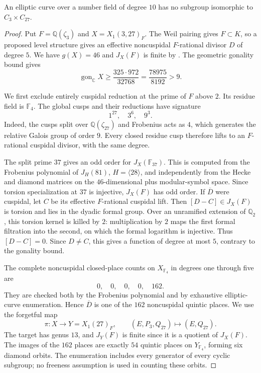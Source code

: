 \begin{proposition}\label{prop:decic-no327}
An elliptic curve over a number field of degree $10$ has no subgroup
isomorphic to $C_3\times C_{27}$.
\end{proposition}
\begin{proof}
Put $F=\mathbb Q(\zeta_3)$ and $X=X_1(3,27)_F$.
The Weil pairing gives $F\subset K$, so a proposed level structure
gives an effective noncuspidal $F$-rational divisor $D$ of degree $5$.
We have $g(X)=46$ and $J_X(F)$ is finite by
\cite[Theorem~4.1]{DS}. The geometric gonality bound
\cite[(2.1)]{NV} gives
\[
 \operatorname{gon}_{\mathbb C}X\geq
 \frac{325\cdot972}{32768}=\frac{78975}{8192}>9.
\]

We first exclude entirely cuspidal reduction at the prime of $F$
above $2$. Its residue field is $\mathbb F_4$.
The global cusps and their reductions have signature
\[
                         1^{27},\quad 3^6,\quad 9^3.
\]
Indeed, the cusps split over $\mathbb Q(\zeta_{27})$ and Frobenius
acts as $4$, which generates the relative Galois group of order $9$.
Every closed residue cusp therefore lifts to an $F$-rational
cuspidal divisor, with the same degree.

The split prime $37$ gives an odd order for $J_X(\mathbb F_{37})$.
This is computed from the Frobenius polynomial of
$J_H(81)$, $H=\langle28\rangle$, and independently from the
Hecke and diamond matrices on the $46$-dimensional plus modular-symbol
space. Since torsion specialization at $37$ is injective,
$J_X(F)$ has odd order.
If $\overline D$ were cuspidal, let $C$ be its effective
$F$-rational cuspidal lift. Then $[D-C]\in J_X(F)$ is torsion
and lies in the dyadic formal group. Over an unramified extension
of $\mathbb Q_2$, this torsion kernel is killed by $2$:
multiplication by $2$ maps the first formal filtration into the
second, on which the formal logarithm is injective.
Thus $[D-C]=0$. Since $D\ne C$, this gives a function of degree
at most $5$, contrary to the gonality bound.

The complete noncuspidal closed-place counts on
$X_{\mathbb F_4}$ in degrees one through five are
\[
                              0,\quad0,\quad0,\quad0,\quad162.
\]
They are checked both by the Frobenius polynomial and by exhaustive
elliptic-curve enumeration. Hence $\overline D$ is one of the
$162$ noncuspidal quintic places.
We use the forgetful map
\[
 \pi:X\longrightarrow Y=X_1(27)_F,\qquad
                    (E,P_3,Q_{27})\longmapsto(E,Q_{27}).
\]
The target has genus $13$, and $J_Y(F)$ is finite since it is a
quotient of $J_X(F)$. The images of the $162$ places are exactly
$54$ quintic places on $Y_{\mathbb F_4}$, forming six diamond orbits.
The enumeration includes every generator of every cyclic subgroup;
no freeness assumption is used in counting these orbits.


\end{proof}
